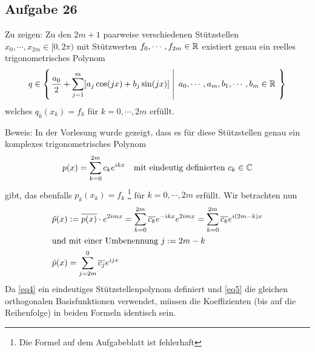 \subsection*{Aufgabe 26}
Zu zeigen: Zu den $2 m + 1 $ paarweise verschiedenen Stützstellen $x_0 , \cdots , x_{2m} \in [0, 2\pi)$ mit
Stützwerten $f_0 , \cdots , f_{2m} \in \mathbb R$ existiert genau ein reelles trigonometrisches
Polynom
\begin{align}
  q \in \left\lbrace \left. \frac{a_0}{2} + \sum_{j = 1}^m [a_j \cos(j x) + b_j \sin(j x)] \;
    \right| \; a_0 , \cdots , a_m , b_1 , \cdots , b_m \in \mathbb R\  \right\rbrace
\end{align}
welches $q_k(x_k) = f_k$ für $k = 0 , \cdots , 2m$ erfüllt.

Beweis: In der Vorlesung wurde gezeigt, dass es für diese Stützstellen genau ein
komplexes trigonometrisches Polynom
\begin{align}
\label{eq4}
  p(x) = \sum_{k = 0}^{2m} c_k e^{i k x}\quad \text{mit eindeutig definierten }c_k \in \mathbb C
\end{align}
gibt, das ebenfalls $p_k(x_k) = f_k$ \footnote{Die Formel auf dem Aufgabeblatt ist fehlerhaft}
für $k = 0 , \cdots , 2m$ erfüllt. Wir betrachten nun
\begin{align}
\nonumber
  \tilde{p}(x) &:= \overline{p(x)} \cdot e^{2 i m x } =
    \sum_{k = 0}^{2m} \overline{c_k} e^{- i k x} e^{2 i m x } =
    \sum_{k = 0}^{2m} \overline{c_k} e^{ i (2m - k) x } \\
\intertext{und mit einer Umbenennung $j := 2 m - k$}
\label{eq5}
  \tilde{p}(x) &= \sum_{j = 2m}^0 \overline{c_j} e^{ i j x }
\end{align}
Da \eqref{eq4} ein eindeutiges Stützstellenpolynom definiert und \eqref{eq5} die gleichen
orthogonalen Basisfunktionen verwendet, müssen die Koeffizienten (bis auf die Reihenfolge)
in beiden Formeln identisch sein.

